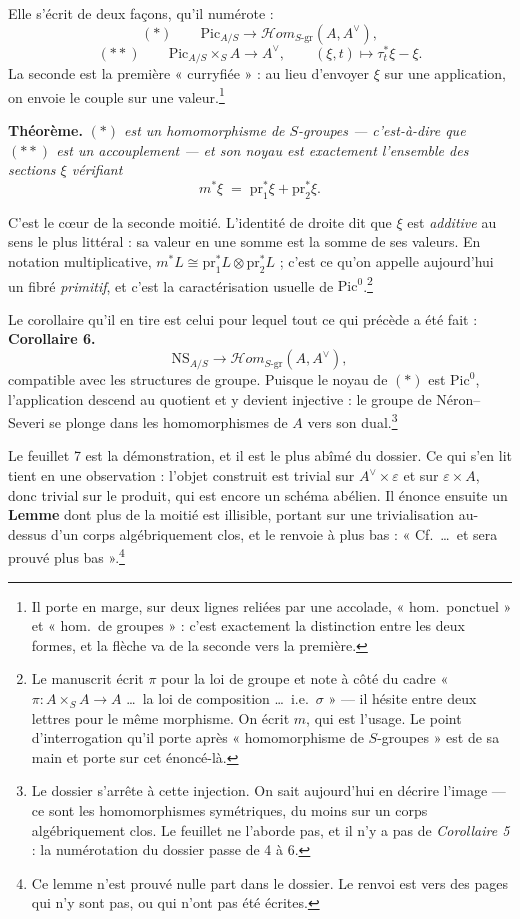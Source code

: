 \documentclass[11pt,a4paper]{article}
\begin{document}
Elle s'écrit de deux façons, qu'il numérote :
\[
  (*) \qquad \mathrm{Pic}_{A/S} \longrightarrow
  \mathcal{H}om_{S\text{-gr}}(A, A^{\vee}),
\]
\[
  (**) \qquad \mathrm{Pic}_{A/S} \times_{S} A \longrightarrow A^{\vee},
  \qquad (\xi, t) \longmapsto \tau_{t}^{*}\xi - \xi .
\]
La seconde est la première « curryfiée » : au lieu d'envoyer $\xi$ sur une
application, on envoie le couple sur une valeur.\footnote{Il porte en marge,
sur deux lignes reliées par une accolade, « hom.\ ponctuel » et « hom.\ de
groupes » : c'est exactement la distinction entre les deux formes, et la
flèche va de la seconde vers la première.}

\textbf{Théorème.} \emph{$(*)$ est un homomorphisme de $S$-groupes — c'est-à-dire
que $(**)$ est un accouplement — et son noyau est exactement l'ensemble des
sections $\xi$ vérifiant}
\[
  m^{*}\xi \;=\; \mathrm{pr}_{1}^{*}\xi + \mathrm{pr}_{2}^{*}\xi .
\]

C'est le cœur de la seconde moitié. L'identité de droite dit que $\xi$ est
\emph{additive} au sens le plus littéral : sa valeur en une somme est la somme
de ses valeurs. En notation multiplicative,
$m^{*}L \cong \mathrm{pr}_{1}^{*}L \otimes \mathrm{pr}_{2}^{*}L$ ; c'est ce
qu'on appelle aujourd'hui un fibré \emph{primitif}, et c'est la
caractérisation usuelle de $\mathrm{Pic}^{0}$.\footnote{Le manuscrit écrit
$\pi$ pour la loi de groupe et note à côté du cadre « $\pi : A \times_{S} A \to
A$ \ldots\ la loi de composition \ldots\ i.e.\ $\sigma$ » — il hésite entre deux
lettres pour le même morphisme. On écrit $m$, qui est l'usage. Le point
d'interrogation qu'il porte après « homomorphisme de $S$-groupes » est de sa
main et porte sur cet énoncé-là.}

Le corollaire qu'il en tire est celui pour lequel tout ce qui précède a été
fait :
\textbf{Corollaire 6.}\quad
\[
  \mathrm{NS}_{A/S} \longrightarrow \mathcal{H}om_{S\text{-gr}}(A, A^{\vee}),
\]
compatible avec les structures de groupe. Puisque le noyau de $(*)$ est
$\mathrm{Pic}^{0}$, l'application descend au quotient et y devient
injective : le groupe de Néron--Severi se plonge dans les homomorphismes de
$A$ vers son dual.\footnote{Le dossier s'arrête à cette injection. On sait
aujourd'hui en décrire l'image — ce sont les homomorphismes symétriques, du
moins sur un corps algébriquement clos. Le feuillet ne l'aborde pas, et il n'y
a pas de \emph{Corollaire 5} : la numérotation du dossier passe de 4 à 6.}

Le feuillet 7 est la démonstration, et il est le plus abîmé du dossier. Ce qui
s'en lit tient en une observation : l'objet construit est trivial sur
$A^{\vee} \times \varepsilon$ et sur $\varepsilon \times A$, donc trivial sur
le produit, qui est encore un schéma abélien. Il énonce ensuite un
\textbf{Lemme} dont plus de la moitié est illisible, portant sur une
trivialisation au-dessus d'un corps algébriquement clos, et le renvoie à plus
bas : « Cf.\ \ldots\ et sera prouvé plus bas ».\footnote{Ce lemme n'est prouvé
nulle part dans le dossier. Le renvoi est vers des pages qui n'y sont pas, ou
qui n'ont pas été écrites.}
\end{document}
